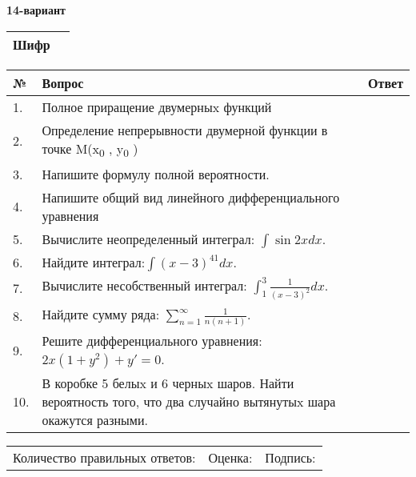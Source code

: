 \documentclass{article}
\begin{document}
  \egroup
  
  \newpage
  
  
  \textbf{14-вариант}\\
  
  \bgroup
  \def\arraystretch{1.6} %
  
  \begin{tabular}{|m{5.7cm}|m{9.5cm}|}
  \hline
  Шифр & \\
  \hline
  \end{tabular}
  
  \vspace{1cm}
  
  \begin{tabular}{|m{0.7cm}|m{10cm}|m{4cm}|}
  \hline
  № & Вопрос & Ответ \\
  \hline
  1. & Полное приращение двумерныx функций &  \\
  \hline
  2. & Определение непрерывности двумерной функции в точке M(x\textsubscript{0} , y\textsubscript{0} ) &  \\
  \hline
  3. & Напишите формулу полной вероятности. &  \\
  \hline
  4. & Напишите общий вид линейного дифференциального уравнения &  \\
  \hline
  5. & Вычислите неопределенный интеграл: \(\int{\sin{2x}dx}\). &  \\
  \hline
  6. & Найдите интеграл:\(\int{(x - 3)^{41}}dx\). &  \\
  \hline
  7. & Вычислите несобственный интеграл: \(\int_{1}^{3}{\frac{1}{(x - 3)^{2}}dx}\). &  \\
  \hline
  8. & Найдите сумму ряда: \(\sum_{n = 1}^{\infty}\frac{1}{n(n + 1)}\). &  \\
  \hline
  9. & Решите дифференциального уравнения: \(2x\left( 1 + y^{2} \right) + y' = 0\). &  \\
  \hline
  10. & В коробке 5 белыx и 6 черныx шаров. Найти вероятность того, что два случайно вытянутыx шара окажутся разными. &  \\
  \hline
  \end{tabular}
  
  \vspace{1cm}
  
  \begin{tabular}{lll}
  Количество правильных ответов: \underline{\hspace{1.5cm}} & 
  Оценка: \underline{\hspace{1.5cm}} & 
  Подпись: \underline{\hspace{2cm}} \\
  \end{tabular}
  
\end{document}
